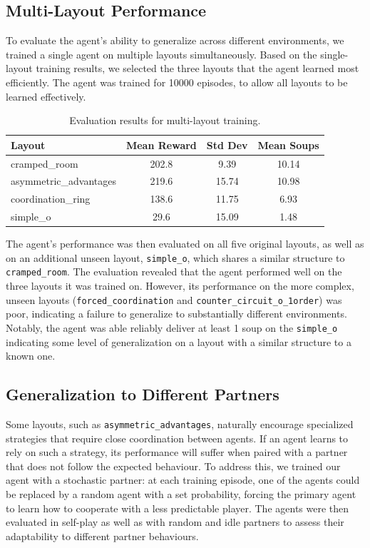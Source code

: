 \documentclass{article}
\begin{document}
\subsection{Multi-Layout Performance}
To evaluate the agent's ability to generalize across different environments, we trained a single agent on multiple layouts simultaneously. Based on the single-layout training results, we selected the three layouts that the agent learned most efficiently. The agent was trained for 10000 episodes, to allow all layouts to be learned effectively.

\begin{table}[ht]
\centering
\caption{Evaluation results for multi-layout training.}
\label{tab:multi_layout_results}
\begin{tabular}{lccc}
\toprule
Layout & \multicolumn{1}{c}{Mean Reward} & \multicolumn{1}{c}{Std Dev} & \multicolumn{1}{c}{Mean Soups} \\
\midrule
cramped\_room & 202.8 & 9.39 & 10.14 \\
asymmetric\_advantages & 219.6 & 15.74 & 10.98\\
coordination\_ring & 138.6 & 11.75 & 6.93 \\
simple\_o & 29.6  & 15.09 & 1.48 \\
\bottomrule
\end{tabular}
\end{table}

The agent's performance was then evaluated on all five original layouts, as well as on an additional unseen layout, \texttt{simple\_o}, which shares a similar structure to \texttt{cramped\_room}. The evaluation revealed that the agent performed well on the three layouts it was trained on. However, its performance on the more complex, unseen layouts (\texttt{forced\_coordination} and \texttt{counter\_circuit\_o\_1order}) was poor, indicating a failure to generalize to substantially different environments. Notably, the agent was able reliably deliver at least 1 soup on the \texttt{simple\_o} indicating some level of generalization on a layout with a similar structure to a known one.


\subsection{Generalization to Different Partners}
Some layouts, such as \texttt{asymmetric\_advantages}, naturally encourage specialized strategies that require close coordination between agents. If an agent learns to rely on such a strategy, its performance will suffer when paired with a partner that does not follow the expected behaviour. To address this, we trained our agent with a stochastic partner: at each training episode, one of the agents could be replaced by a random agent with a set probability, forcing the primary agent to learn how to cooperate with a less predictable player. The agents were then evaluated in self-play as well as with random and idle partners to assess their adaptability to different partner behaviours.
\end{document}
